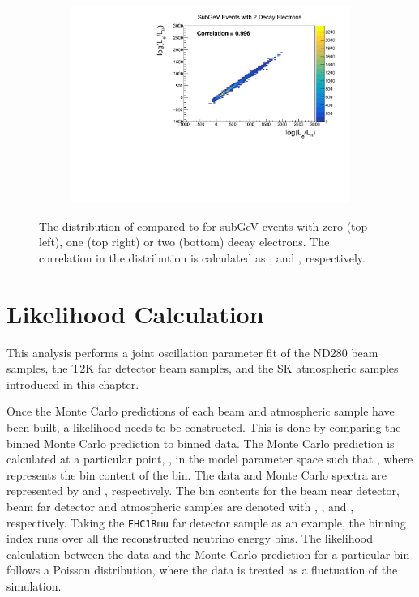 \begin{figure}[h]
\begin{subfigure}[t]{0.49\textwidth}
    \includegraphics[width=\textwidth, trim={0mm 0mm 0mm 0mm}, clip,page=1]{Figures/Selections/Correlation_SG2Dcy.pdf}
  \end{subfigure}
  \caption{The distribution of  compared to  for subGeV events with zero (top left), one (top right) or two (bottom) decay electrons. The correlation in the distribution is calculated as ,  and , respectively.}
  \label{fig:SelsAndSysts_LLHCorrelation}
\end{figure}

\section{Likelihood Calculation}
\label{sec:OscillationAnalysis_LLHCalc}

This analysis performs a joint oscillation parameter fit of the ND280 beam samples, the T2K far detector beam samples, and the SK atmospheric samples introduced in this chapter. 

Once the Monte Carlo predictions of each beam and atmospheric sample have been built, a likelihood needs to be constructed. This is done by comparing the binned Monte Carlo prediction to binned data. The Monte Carlo prediction is calculated at a particular point, \quickmath{\vec{\theta}}, in the model parameter space such that , where  represents the bin content of the  bin. The data and Monte Carlo spectra are represented by  and , respectively. The bin contents for the beam near detector, beam far detector and atmospheric samples are denoted with , , and , respectively. Taking the \texttt{FHC1Rmu} far detector sample as an example, the binning index runs over all the reconstructed neutrino energy bins. The likelihood calculation between the data and the Monte Carlo prediction for a particular bin follows a Poisson distribution, where the data is treated as a fluctuation of the simulation. 

